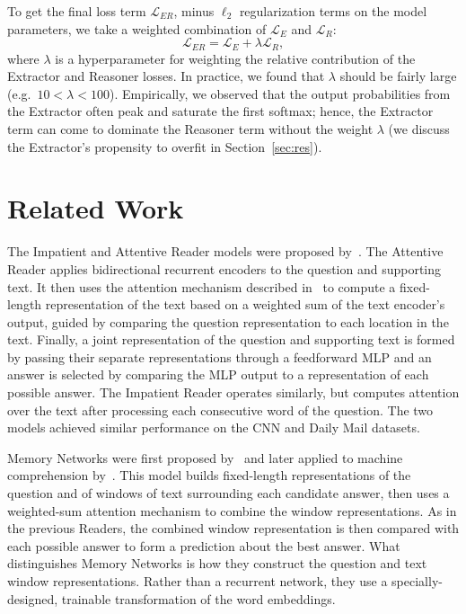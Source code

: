 \documentclass[11pt,letterpaper]{article}
\newcommand{\LL}{\mathcal{L}}
\begin{document}
To get the final loss term $\LL_{ER}$, minus $\ell_2$ regularization terms on the model parameters, we take a weighted combination of $\LL_{E}$ and $\LL_{R}$:
\begin{equation}
\LL_{ER} = \LL_{E} + \lambda \LL_{R},
\label{eq:joint_loss}
\end{equation}
where $\lambda$ is a hyperparameter for weighting the relative contribution of the Extractor and Reasoner losses. In practice, we found that $\lambda$ should be fairly large (e.g.~$10 < \lambda < 100$).
Empirically, we observed that the output probabilities from the Extractor often peak and saturate the first softmax; hence, the Extractor term can come to dominate the Reasoner term without the weight $\lambda$ (we discuss the Extractor's propensity to overfit in Section~\ref{sec:res}).


\section{Related Work}
\label{sec:related}
The Impatient and Attentive Reader models were proposed by~. The Attentive Reader applies bidirectional recurrent encoders to the question and supporting text. It then uses the attention mechanism described in~ to compute a fixed-length representation of the text based on a weighted sum of the text encoder's output, guided by comparing the question representation to each location in the text. Finally, a joint representation of the question and supporting text is formed by passing their separate representations through a feedforward MLP and an answer is selected by comparing the MLP output to a representation of each possible answer. The Impatient Reader operates similarly, but computes attention over the text after processing each consecutive word of the question. The two models achieved similar performance on the CNN and Daily Mail datasets.

Memory Networks were first proposed by~ and later applied to machine comprehension by~. This model builds fixed-length representations of the question and of windows of text surrounding each candidate answer, then uses a weighted-sum attention mechanism to combine the window representations. As in the previous Readers, the combined window representation is then compared with each possible answer to form a prediction about the best answer. What distinguishes Memory Networks is how they construct the question and text window representations. Rather than a recurrent network, they use a specially-designed, trainable transformation of the word embeddings.
\end{document}
